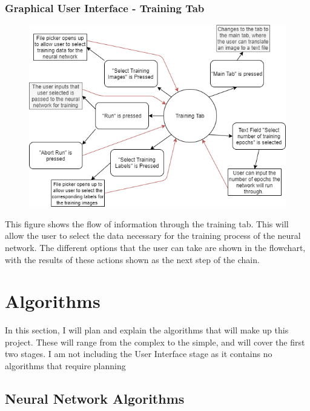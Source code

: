 \documentclass{report}
\begin{document}
\subsubsection{Graphical User Interface - Training Tab}
\begin{figure}[H]
    \centering
    \includegraphics[width=12cm]{Images/Structure Of Program/Flowchart for Training Tab.png}
\end{figure}
This figure shows the flow of information through the training tab. This will allow the user to select the data necessary for the training process of the neural network. The different options that the user can take are shown in the flowchart, with the results of these actions shown as the next step of the chain.
\newpage

\section{Algorithms}
In this section, I will plan and explain the algorithms that will make up this project. These will range from the complex to the simple, and will cover the first two stages. I am not including the User Interface stage as it contains no algorithms that require planning

\subsection{Neural Network Algorithms}
\end{document}
